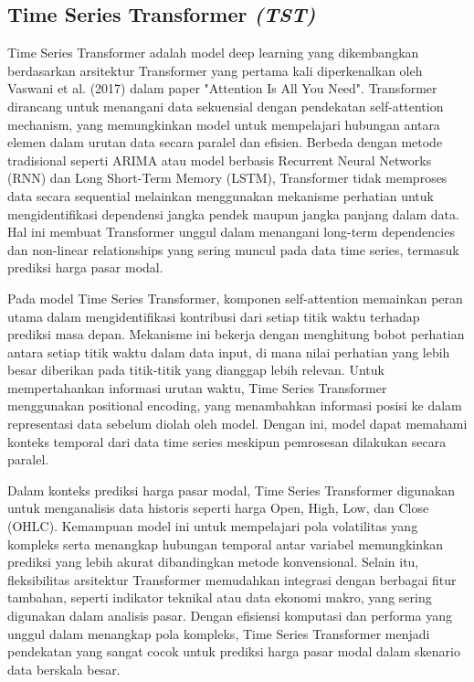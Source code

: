\subsection{Time Series Transformer \textit{(TST)}}
Time Series Transformer adalah model deep learning yang dikembangkan berdasarkan arsitektur Transformer yang pertama kali diperkenalkan oleh Vaswani et al. (2017) dalam paper "Attention Is All You Need". Transformer dirancang untuk menangani data sekuensial dengan pendekatan self-attention mechanism, yang memungkinkan model untuk mempelajari hubungan antara elemen dalam urutan data secara paralel dan efisien. Berbeda dengan metode tradisional seperti ARIMA atau model berbasis Recurrent Neural Networks (RNN) dan Long Short-Term Memory (LSTM), Transformer tidak memproses data secara sequential melainkan menggunakan mekanisme perhatian untuk mengidentifikasi dependensi jangka pendek maupun jangka panjang dalam data\autocite{hochreiter1997long}. Hal ini membuat Transformer unggul dalam menangani long-term dependencies dan non-linear relationships yang sering muncul pada data time series, termasuk prediksi harga pasar modal.

Pada model Time Series Transformer, komponen self-attention memainkan peran utama dalam mengidentifikasi kontribusi dari setiap titik waktu terhadap prediksi masa depan. Mekanisme ini bekerja dengan menghitung bobot perhatian antara setiap titik waktu dalam data input, di mana nilai perhatian yang lebih besar diberikan pada titik-titik yang dianggap lebih relevan\autocite{vaswani2017attention}. Untuk mempertahankan informasi urutan waktu, Time Series Transformer menggunakan positional encoding, yang menambahkan informasi posisi ke dalam representasi data sebelum diolah oleh model. Dengan ini, model dapat memahami konteks temporal dari data time series meskipun pemrosesan dilakukan secara paralel.

Dalam konteks prediksi harga pasar modal, Time Series Transformer digunakan untuk menganalisis data historis seperti harga Open, High, Low, dan Close (OHLC). Kemampuan model ini untuk mempelajari pola volatilitas yang kompleks serta menangkap hubungan temporal antar variabel memungkinkan prediksi yang lebih akurat dibandingkan metode konvensional\autocite{goodfellow2016deep}. Selain itu, fleksibilitas arsitektur Transformer memudahkan integrasi dengan berbagai fitur tambahan, seperti indikator teknikal atau data ekonomi makro, yang sering digunakan dalam analisis pasar. Dengan efisiensi komputasi dan performa yang unggul dalam menangkap pola kompleks, Time Series Transformer menjadi pendekatan yang sangat cocok untuk prediksi harga pasar modal dalam skenario data berskala besar.



